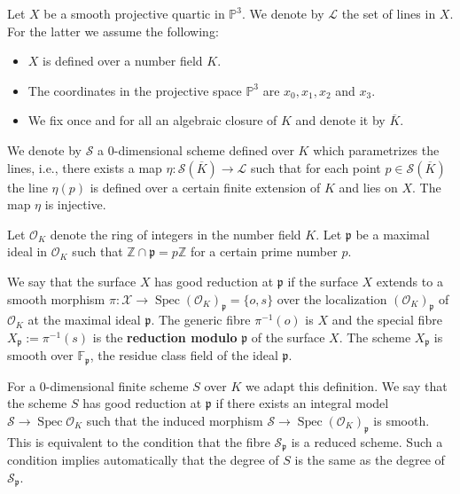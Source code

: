 \documentclass{article}
\theoremstyle{plain}
\theoremstyle{definition}
\DeclareMathOperator{\Spec}{Spec}
\numberwithin{equation}{section}
\begin{document}
Let $X$ be a smooth projective quartic in $\mathbb{P}^{3}$. We denote by $\mathcal{L}$ the set of lines in $X$. For the latter we assume the following:
\begin{itemize}
	\item $X$ is defined over a number field $K$.
	\item The coordinates in the projective space $\mathbb{P}^{3}$ are $x_0,x_1,x_2$ and $x_3$.
	\item We fix once and for all an algebraic closure of $K$ and denote it by $\overline{K}$.
\end{itemize}

We denote by $\mathcal{S}$ a $0$-dimensional scheme defined over $K$ which parametrizes the lines, i.e., there exists a map $\eta: \mathcal{S}(\overline{K})\rightarrow \mathcal{L}$ such that for each point $p\in\mathcal{S}(\overline{K})$ the line $\eta(p)$ is defined over a certain finite extension of $K$ and lies on $X$. The map $\eta$ is injective.

Let $\mathcal{O}_{K}$ denote the ring of integers in the number field $K$. Let $\mathfrak{p}$ be a maximal ideal in $\mathcal{O}_{K}$ such that $\mathbb{Z}\cap\mathfrak{p} = p\mathbb{Z}$ for a certain prime number $p$.

We say that the surface $X$ has good reduction at $\mathfrak{p}$ if the surface $X$ extends to a smooth morphism $\pi:\mathcal{X}\rightarrow \Spec(\mathcal{O}_{K})_{\mathfrak{p}}=\{o,s\}$ over the localization $(\mathcal{O}_{K})_{\mathfrak{p}}$ of $\mathcal{O}_{K}$ at the maximal ideal $\mathfrak{p}$. The generic fibre $\pi^{-1}(o)$ is $X$ and the special fibre $X_{\mathfrak{p}}:=\pi^{-1}(s)$ is the \textbf{reduction modulo } $\mathfrak{p}$ of the surface $X$. The scheme $X_{\mathfrak{p}}$ is smooth over $\mathbb{F}_{\mathfrak{p}}$, the residue class field of the ideal $\mathfrak{p}$. 

For a $0$-dimensional finite scheme $S$ over $K$ we adapt this definition. We say that the scheme $S$ has good reduction at $\mathfrak{p}$ if there exists an integral model $\mathcal{S}\rightarrow\Spec\mathcal{O}_{K}$ such that the induced morphism $\mathcal{S}\rightarrow\Spec(\mathcal{O}_{K})_{\mathfrak{p}}$ is smooth. This is equivalent to the condition that the fibre $\mathcal{S}_{\mathfrak{p}}$ is a reduced scheme. Such a condition implies automatically that the degree of $S$ is the same as the degree of $\mathcal{S}_{\mathfrak{p}}$. 
\end{document}
